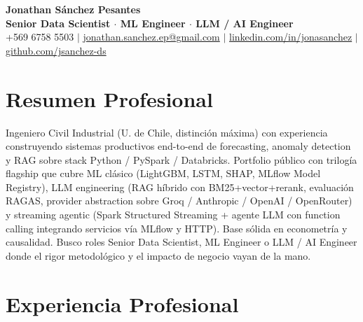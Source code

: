 \documentclass[a4paper,10pt]{article}
\newcommand{\sectionspace}{\vspace{0.15cm}}
\begin{document}
\begin{center}
    \textbf{\LARGE Jonathan Sánchez Pesantes} \\[3pt]
    \normalsize \textbf{Senior Data Scientist $\cdot$ ML Engineer $\cdot$ LLM / AI Engineer} \\[3pt]
    \small
    +569 6758 5503 \quad $|$ \quad
    \href{mailto:jonathan.sanchez.ep@gmail.com}{jonathan.sanchez.ep@gmail.com} \quad $|$ \quad
    \href{https://www.linkedin.com/in/jonasanchez}{linkedin.com/in/jonasanchez} \quad $|$ \quad
    \href{https://github.com/jsanchez-ds}{github.com/jsanchez-ds}
\end{center}
\vspace{0.1cm}

\section*{Resumen Profesional}
Ingeniero Civil Industrial (U. de Chile, distinción máxima) con experiencia construyendo sistemas productivos end-to-end de forecasting, anomaly detection y RAG sobre stack Python / PySpark / Databricks. Portfolio público con trilogía flagship que cubre ML clásico (LightGBM, LSTM, SHAP, MLflow Model Registry), LLM engineering (RAG híbrido con BM25+vector+rerank, evaluación RAGAS, provider abstraction sobre Groq / Anthropic / OpenAI / OpenRouter) y streaming agentic (Spark Structured Streaming + agente LLM con function calling integrando servicios vía MLflow y HTTP). Base sólida en econometría y causalidad. Busco roles Senior Data Scientist, ML Engineer o LLM / AI Engineer donde el rigor metodológico y el impacto de negocio vayan de la mano.

\sectionspace

\section*{Experiencia Profesional}
\end{document}
